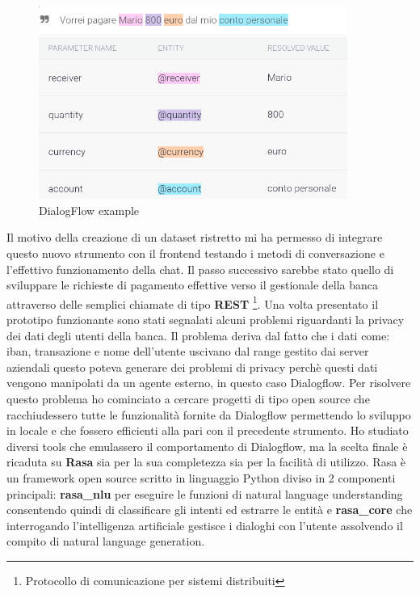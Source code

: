 \begin{figure}[H]
 \centering
  \includegraphics[width=0.9\textwidth]{img/nludatasetexample.png}
 \caption{DialogFlow example}
\end{figure}
Il motivo della creazione di un dataset ristretto mi ha permesso di integrare questo nuovo strumento con il frontend testando i metodi di conversazione e l'effettivo funzionamento della chat.
Il passo successivo sarebbe stato quello di sviluppare le richieste di pagamento effettive verso il gestionale della banca attraverso delle semplici chiamate di tipo \textbf{REST} \footnote{Protocollo di comunicazione per sistemi distribuiti}. 
Una volta presentato il prototipo funzionante sono stati segnalati alcuni problemi riguardanti la privacy dei dati degli utenti della banca.
Il problema deriva dal fatto che i dati come: iban, transazione e nome dell'utente uscivano dal range gestito dai server aziendali questo poteva generare dei problemi di privacy perchè questi dati vengono manipolati da un agente esterno, in questo caso Dialogflow.
Per risolvere questo problema ho cominciato a cercare progetti di tipo open source che racchiudessero tutte le funzionalità fornite da Dialogflow permettendo lo sviluppo in locale e che fossero efficienti alla pari con il precedente strumento.
Ho studiato diversi tools che emulassero il comportamento di Dialogflow, ma la scelta finale è ricaduta su \textbf{Rasa} sia per la sua completezza sia per la facilità di utilizzo. Rasa è un framework open source scritto in linguaggio Python diviso in 2 componenti principali: \textbf{rasa\_nlu} per eseguire le funzioni di natural language understanding consentendo quindi di classificare gli intenti ed estrarre le entità e \textbf{rasa\_core} che interrogando l'intelligenza artificiale gestisce i dialoghi con l'utente assolvendo il compito di natural language generation.
